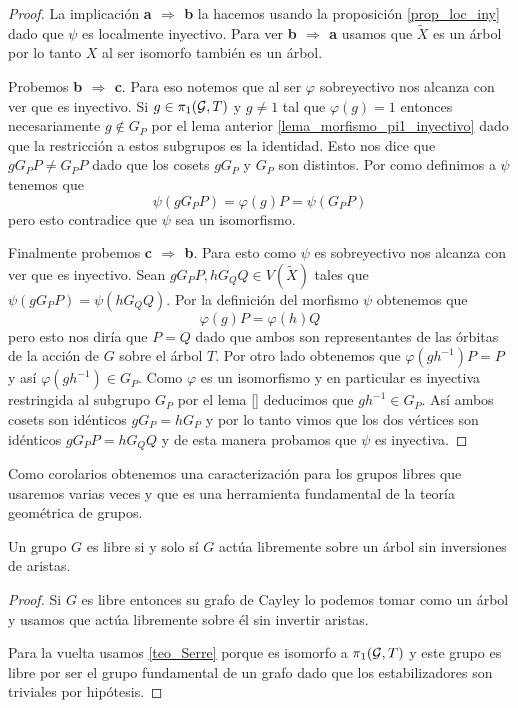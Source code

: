 \documentclass[tesis.tex]{subfiles}
\newcommand{\cG}{ {\cal G} }
\newcommand{\Xm}{\widetilde X}
\begin{document}
\begin{proof}	
		 La implicación \textbf{a $\Rightarrow$ b} la hacemos usando la proposición \ref{prop_loc_iny} dado que $\psi$ es localmente inyectivo.
		 Para ver \textbf{b $\Rightarrow$ a} usamos que $\Xm$ es un árbol por lo tanto $X$ al ser isomorfo también es un árbol.
		 
		 Probemos \textbf{b $\Rightarrow$ c}. 
		 Para eso notemos que al ser $\varphi$ sobreyectivo nos alcanza con ver que es inyectivo.
		 Si $g \in \pi_1({\cal G}, T)$ y $g \neq 1$ tal que $\varphi(g)= 1$ entonces necesariamente $g \notin G_P$ por el lema anterior \ref{lema_morfismo_pi1_inyectivo} dado que la restricción a estos subgrupos es la identidad.
		 Esto nos dice que $g G_P P \neq G_P P$ dado que los cosets $gG_P$ y $G_P$ son distintos. Por como definimos a $\psi$ tenemos que 
		 \[
		 \psi (gG_P P) = \varphi(g) P  = \psi(G_P P)
		 \] 
		 pero esto contradice que $\psi$ sea un isomorfismo.
		 
		 Finalmente probemos \textbf{c $\Rightarrow$ b}. 
		 Para esto como $\psi$ es sobreyectivo nos alcanza con ver que es inyectivo.
		 Sean $gG_PP, hG_QQ \in V(\Xm)$ tales que $\psi(gG_PP) = \psi(hG_QQ)$.
		 Por la definición del morfismo $\psi$ obtenemos que 
		 \[
		 	\varphi(g)P = \varphi(h)Q
		 \]
		 pero esto nos diría que $P = Q$ dado que ambos son representantes de las órbitas de la acción de $G$ sobre el árbol $T$. 
		 Por otro lado obtenemos que $\varphi(g h^{-1}) P  =  P$ y así $\varphi(gh^{-1}) \in G_P$. 
		 Como $\varphi$ es un isomorfismo y en particular es inyectiva restringida al subgrupo $G_P$ por el lema \ref{} deducimos que $gh^{-1} \in G_P$.
		 Así ambos cosets son idénticos $g G_P = h G_P$ y por lo tanto vimos que los dos vértices son idénticos $gG_PP  = hG_QQ$ y de esta manera probamos que $\psi$ es inyectiva.
\end{proof}

Como corolarios obtenemos una caracterización para los grupos libres que usaremos varias veces y que es una herramienta fundamental de la teoría geométrica de grupos.

\begin{coro}
	Un grupo $G$ es libre si y solo sí $G$ actúa libremente sobre un árbol sin inversiones de aristas. 
\end{coro}
\begin{proof}
	Si $G$ es libre entonces su grafo de Cayley lo podemos tomar como un árbol y usamos que actúa libremente sobre él sin invertir aristas.
	
	Para la vuelta usamos \ref{teo_Serre} porque es isomorfo a $\pi_1(\cG, T)$ y este grupo es libre por ser el grupo fundamental de un grafo dado que los estabilizadores son triviales por hipótesis.
\end{proof}
\end{document}
